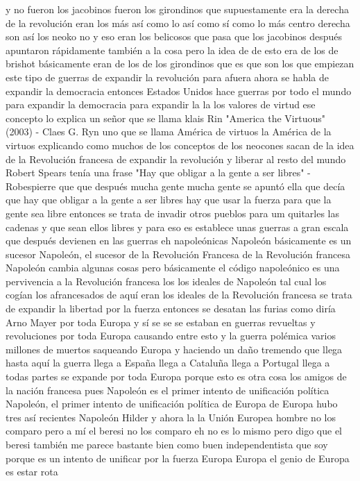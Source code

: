 y no fueron los jacobinos fueron los girondinos que supuestamente era la derecha
de la revolución eran los más así como lo así como sí como lo más centro derecha son así
los neoko no y eso eran los belicosos que pasa que los jacobinos después apuntaron rápidamente
también a la cosa pero la idea de de esto era de los de brishot básicamente eran de los de los girondinos
que es que son los que empiezan este tipo de guerras de expandir la revolución para afuera ahora se habla de expandir la democracia
entonces Estados Unidos hace guerras por todo el mundo para expandir la democracia para expandir la
la los valores de virtud ese concepto lo explica un señor que se llama klais Rin
"America the Virtuous" (2003) - Claes G. Ryn
uno que se llama América de virtuos la América de la virtuos explicando como muchos de los conceptos de los neocones sacan de la idea de la Revolución francesa
de expandir la revolución y liberar al resto del mundo Robert Spears tenía una frase
"Hay que obligar a la gente a ser libres" - Robespierre
que que después mucha gente mucha gente se apuntó ella que decía que hay que obligar a la gente a ser libres
hay que usar la fuerza para que la gente sea libre entonces se trata de invadir otros pueblos
para um quitarles las cadenas y que sean ellos libres y para eso es establece unas guerras a gran escala
que después devienen en las guerras eh napoleónicas Napoleón básicamente es un sucesor
Napoleón, el sucesor de la Revolución Francesa
de la Revolución francesa Napoleón cambia algunas cosas pero básicamente el código napoleónico es una
pervivencia a la Revolución francesa los los ideales de Napoleón tal cual los cogían los afrancesados de aquí
eran los ideales de la Revolución francesa se trata de expandir la libertad por la fuerza entonces se desatan las furias
como diría Arno Mayer por toda Europa y sí se se se estaban en guerras
revueltas y revoluciones por toda Europa causando entre esto y la guerra polémica varios millones de muertos saqueando Europa y haciendo
un daño tremendo que llega hasta aquí la guerra llega a España llega a Cataluña llega a Portugal llega a todas partes se expande por toda Europa
porque esto es otra cosa los amigos de la nación francesa pues Napoleón es el primer intento de unificación política
Napoleón, el primer intento de unificación política de Europa
de Europa hubo tres así recientes Napoleón Hilder y ahora la la Unión Europea
hombre no los comparo pero a mí el beresi no los comparo eh no es lo mismo
pero digo que el beresi también me parece bastante bien como buen independentista que soy
porque es un intento de unificar por la fuerza Europa Europa el genio de Europa es estar rota
